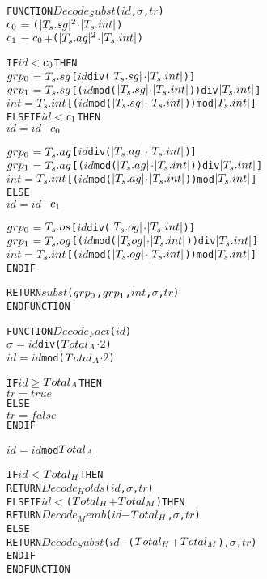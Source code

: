 \documentclass[11pt]{report}
\newenvironment{vverbatim}
{
  \begin{alltt}
}
{
  \vspace{-\baselineskip}
  \end{alltt}
}
\begin{document}
        \begin{vverbatim}
  FUNCTION \(Decode_Subst\)(\(id\), \(\sigma\), \(tr\))
    \(c\sb{0}\) \(=\) (\(|T\sb{s}.sg|\sp{2}\) \(\cdot\) \(|T\sb{s}.int|\)) 
    \(c\sb{1}\) \(=\) \(c\sb{0}\) \(+\) (\(|T\sb{s}.ag|\sp{2}\) \(\cdot\) \(|T\sb{s}.int|\)) 

    IF \(id\) \(<\) \(c\sb{0}\) THEN
      \(grp\sb{0}\) \(=\) \(T\sb{s}.sg\)[\(id\) div (\(|T\sb{s}.sg|\) \(\cdot\) \(|T\sb{s}.int|\))]
      \(grp\sb{1}\) \(=\) \(T\sb{s}.sg\)[(\(id\) mod (\(|T\sb{s}.sg|\) \(\cdot\) \(|T\sb{s}.int|\))) div \(|T\sb{s}.int|\)]
      \(int\) \(=\) \(T\sb{s}.int\)[(\(id\) mod (\(|T\sb{s}.sg|\) \(\cdot\) \(|T\sb{s}.int|\))) mod \(|T\sb{s}.int|\)]
    ELSE IF \(id\) \(<\) \(c\sb{1}\) THEN
      \(id\) \(=\) \(id\) \(-\) \(c\sb{0}\)

      \(grp\sb{0}\) \(=\) \(T\sb{s}.ag\)[\(id\) div (\(|T\sb{s}.ag|\) \(\cdot\) \(|T\sb{s}.int|\))]
      \(grp\sb{1}\) \(=\) \(T\sb{s}.ag\)[(\(id\) mod (\(|T\sb{s}.ag|\) \(\cdot\) \(|T\sb{s}.int|\))) div \(|T\sb{s}.int|\)]
      \(int\) \(=\) \(T\sb{s}.int\)[(\(id\) mod (\(|T\sb{s}.ag|\) \(\cdot\) \(|T\sb{s}.int|\))) mod \(|T\sb{s}.int|\)]
    ELSE
      \(id\) \(=\) \(id\) \(-\) \(c\sb{1}\)

      \(grp\sb{0}\) \(=\) \(T\sb{s}.os\)[\(id\) div (\(|T\sb{s}.og|\) \(\cdot\) \(|T\sb{s}.int|\))]
      \(grp\sb{1}\) \(=\) \(T\sb{s}.og\)[(\(id\) mod (\(|T\sb{s}og|\) \(\cdot\) \(|T\sb{s}.int|\))) div \(|T\sb{s}.int|\)]
      \(int\) \(=\) \(T\sb{s}.int\)[(\(id\) mod (\(|T\sb{s}.og|\) \(\cdot\) \(|T\sb{s}.int|\))) mod \(|T\sb{s}.int|\)]
    ENDIF

    RETURN \(subst\)(\(grp\sb{0}\), \(grp\sb{1}\), \(int\), \(\sigma\), \(tr\))
  ENDFUNCTION
        \end{vverbatim}

        \begin{vverbatim}
  FUNCTION \(Decode_Fact\)(\(id\))
    \(\sigma\) \(=\) \(id\) div (\(Total\sb{A}\) \(\cdot\) \(2\))
    \(id\) \(=\) \(id\) mod (\(Total\sb{A}\) \(\cdot\) \(2\)) 

    IF \(id\) \(\geq\) \(Total\sb{A}\) THEN
      \(tr\) \(=\) \(true\)
    ELSE
      \(tr\) \(=\) \(false\)
    ENDIF

    \(id\) \(=\) \(id\) mod \(Total\sb{A}\)

    IF \(id\) \(<\) \(Total\sb{H}\) THEN
      RETURN \(Decode_Holds\)(\(id\), \(\sigma\), \(tr\))
    ELSEIF \(id\) \(<\) (\(Total\sb{H}\) \(+\) \(Total\sb{M}\)) THEN
      RETURN \(Decode_Memb\)(\(id\) \(-\) \(Total\sb{H}\), \(\sigma\), \(tr\))
    ELSE
      RETURN \(Decode_Subst\)(\(id\) \(-\) (\(Total\sb{H}\) \(+\) \(Total\sb{M}\)), \(\sigma\), \(tr\))
    ENDIF
  ENDFUNCTION
        \end{vverbatim}
\end{document}
